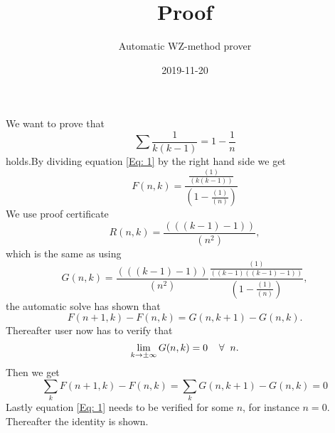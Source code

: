 \documentclass{article}
\title{Proof}
\author{Automatic WZ-method prover}
\date{2019-11-20}
\let\oldforall\forall
\renewcommand{\forall}{\hspace*{2mm}\oldforall\hspace*{1mm}}
\begin{document}
\maketitle
We want to prove that
\begin{equation}\label{Eq: 1}
\sum \frac{1}{k(k-1)} = 1-\frac{1}{n}
\end{equation}
holds.By dividing equation \ref{Eq: 1} by the right hand side we get
\begin{equation}
F(n,k)=\frac{\frac{(1)}{(k(k-1))}}{(1-\frac{(1)}{(n)})}
\end{equation}
We use proof certificate
\begin{equation}
R(n,k)=\frac{(((k-1)-1))}{(n^2)},
\end{equation}
which is the same as using
\begin{equation}
G(n,k)=\frac{(((k-1)-1))}{(n^2)}\frac{\frac{(1)}{((k-1)((k-1)-1))}}{(1-\frac{(1)}{(n)})},
\end{equation}
the automatic solve has  shown that
\begin{equation}\label{Eq: WZ1}
F(n+1,k)-F(n,k)=G(n,k+1)-G(n,k).
\end{equation}
Thereafter user now has to verify that
\begin{equation}
\lim_{k\to\pm\infty}G(n,k)=0\forall n.
\end{equation}
Then we get
\begin{equation}
\sum_k F(n+1,k)-F(n,k)=\sum_k G(n,k+1)-G(n,k)=0\end{equation}Lastly equation \ref{Eq: 1} needs to be verified for some $n$, for instance $n=0$. Thereafter the identity is shown.
\end{document}
